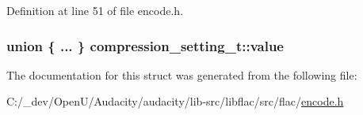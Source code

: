 Definition at line 51 of file encode.\+h.

\subsubsection[{\texorpdfstring{value}{value}}]{\setlength{\rightskip}{0pt plus 5cm}union \{ ... \}   compression\+\_\+setting\+\_\+t\+::value}\hypertarget{structcompression__setting__t_a3b4cc2b4e534dfbfc9d0a59c13510c22}{}\label{structcompression__setting__t_a3b4cc2b4e534dfbfc9d0a59c13510c22}


The documentation for this struct was generated from the following file\+:\begin{DoxyCompactItemize}
\item 
C\+:/\+\_\+dev/\+Open\+U/\+Audacity/audacity/lib-\/src/libflac/src/flac/\hyperlink{libflac_2src_2flac_2encode_8h}{encode.\+h}\end{DoxyCompactItemize}
